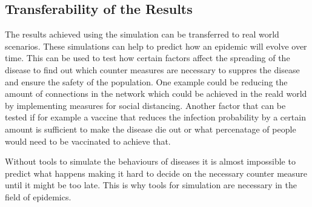 \subsection{Transferability of the Results}
The results achieved using the simulation can be transferred to real world scenarios.
These simulations can help to predict how an epidemic will evolve over time. This can
be used to test how certain factors affect the spreading of the disease to find out which
counter measures are necessary to suppres the disease and ensure the safety of the population.
One example could be reducing the amount of connections in the network which could be achieved
in the reald world by implementing measures for social distancing. Another factor that can be
tested if for example a vaccine that reduces the infection probability by a certain amount 
is sufficient to make the disease die out or what percenatage of people would need to be
vaccinated to achieve that.

Without tools to simulate the behaviours of diseases it is almost impossible to predict
what happens making it hard to decide on the necessary counter measure until it might be too late.
This is why tools for simulation are necessary in the field of epidemics.
